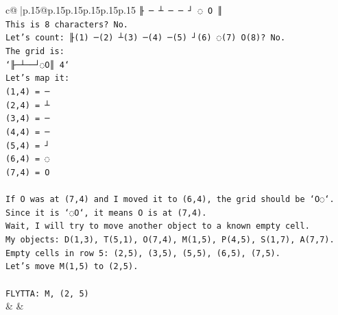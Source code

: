 \documentclass{article}
\begin{document}
{\begin{supertabular}{c@{$\;$}|p{.15\linewidth}@{}p{.15\linewidth}p{.15\linewidth}p{.15\linewidth}p{.15\linewidth}p{.15\linewidth}}
{{{\texttt{╟ ─ ┴ ─ ─ ┘ ◌ O ║} \\
\texttt{This is 8 characters? No.} \\
\texttt{Let's count: ╟(1) ─(2) ┴(3) ─(4) ─(5) ┘(6) ◌(7) O(8)? No.} \\
\texttt{The grid is:} \\
\texttt{`╟─┴──┘◌O║ 4`} \\
\texttt{Let's map it:} \\
\texttt{(1,4) = ─} \\
\texttt{(2,4) = ┴} \\
\texttt{(3,4) = ─} \\
\texttt{(4,4) = ─} \\
\texttt{(5,4) = ┘} \\
\texttt{(6,4) = ◌} \\
\texttt{(7,4) = O} \\
\\ 
\texttt{If O was at (7,4) and I moved it to (6,4), the grid should be `O◌`.} \\
\texttt{Since it is `◌O`, it means O is at (7,4).} \\
\texttt{Wait, I will try to move another object to a known empty cell.} \\
\texttt{My objects: D(1,3), T(5,1), O(7,4), M(1,5), P(4,5), S(1,7), A(7,7).} \\
\texttt{Empty cells in row 5: (2,5), (3,5), (5,5), (6,5), (7,5).} \\
\texttt{Let's move M(1,5) to (2,5).} \\
\\ 
\texttt{FLYTTA: M, (2, 5)} \\
            }
        }
    }
    & & \\ \\


\end{supertabular}}
\end{document}
